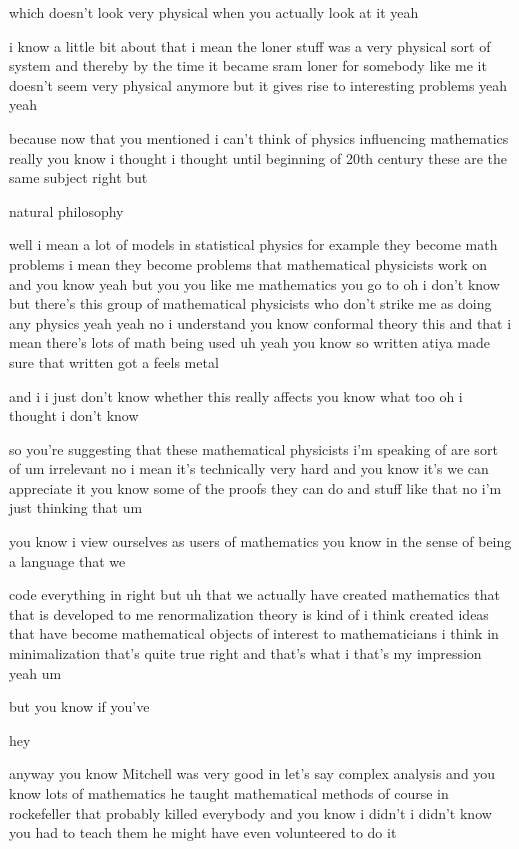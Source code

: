 \begin{description}
which doesn't look very physical when you actually look at it yeah

i know a little bit about that i mean the loner stuff was a very physical sort of system and thereby by the time it became sram loner for somebody like me it doesn't seem very physical anymore but it gives rise to interesting problems yeah yeah

because now that you mentioned i can't think of physics influencing mathematics really you know i thought i thought until beginning of 20th century these are the same subject right but

natural philosophy

well i mean a lot of models in statistical physics for example they become math problems i mean they become problems that mathematical physicists work on and you know yeah but you you like me mathematics you go to oh i don't know but there's this group of mathematical physicists who don't strike me as doing any physics yeah yeah no i understand you know conformal theory this and that i mean there's lots of math being used uh yeah you know so written atiya made sure that written got a feels metal

and i i just don't know whether this really affects you know what too oh i thought i don't know

so you're suggesting that these mathematical physicists i'm speaking of are sort of um irrelevant no i mean it's technically very hard and you know it's we can appreciate it you know some of the proofs they can do and stuff like that no i'm just thinking that um

you know i view ourselves as users of mathematics you know in the sense of being a language that we

code everything in right but uh that we actually have created mathematics that that is developed to me renormalization theory is kind of i think created ideas that have become mathematical objects of interest to mathematicians i think in minimalization that's quite true right and that's what i that's my impression yeah um

but you know if you've

hey

anyway you know Mitchell was very good in let's say complex analysis and you know lots of mathematics he taught mathematical methods of course in rockefeller that probably killed everybody and you know i didn't i didn't know you had to teach them he might have even volunteered to do it


\end{description}

